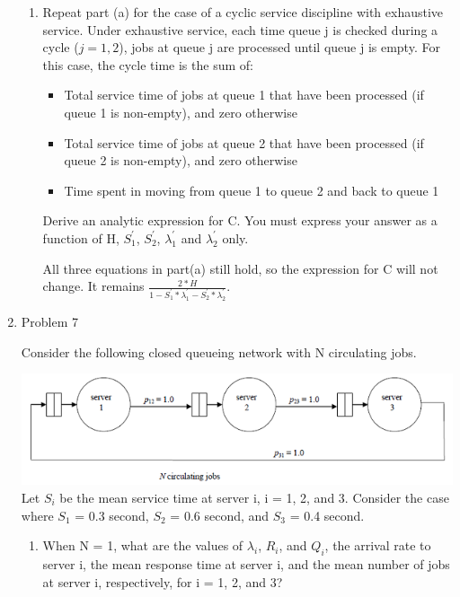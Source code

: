 \documentclass[12pt]{article}
\begin{document}
\begin{enumerate}
\begin{enumerate}
\item{} Repeat part (a) for the case of a cyclic service discipline with exhaustive service. Under exhaustive
service, each time queue j is checked during a cycle ($j = 1, 2$), jobs at queue j are processed until queue
j is empty. For this case, the cycle time is the sum of:
\begin{itemize}
\item{} Total service time of jobs at queue 1 that have been processed (if queue 1 is non-empty), and zero otherwise
\item{} Total service time of jobs at queue 2 that have been processed (if queue 2 is non-empty), and zero otherwise
\item{} Time spent in moving from queue 1 to queue 2 and back to queue 1
\end{itemize}
Derive an analytic expression for C. You must express your answer as a function of H, $S_1^{'}$, $S_2^{'}$, $\lambda_1^{'}$ and $\lambda_2^{'}$ only.

All three equations in part(a) still hold, so the expression for C will not change. It remains $\frac{2 * H}{1 - S_1^{'} * \lambda_1^{'} - S_2^{'} * \lambda_2^{'}}$.
\end{enumerate}
\medskip

\item{Problem 7}

Consider the following closed queueing network with N circulating jobs.

\includegraphics{a1q7.png}
Let $S_i$ be the mean service time at server i, i = 1, 2, and 3. Consider the case where $S_1$ = 0.3 second, $S_2$ = 0.6 second, and $S_3$ = 0.4 second.
\begin{enumerate}
\item{} When N = 1, what are the values of $\lambda_i$, $R_i$, and $Q_i$, the arrival rate to server i, the mean response time at server i, and the mean number of jobs at server i, respectively, for i = 1, 2, and 3?


\end{enumerate}
\end{enumerate}
\end{document}
